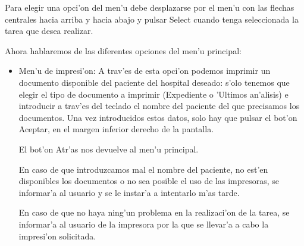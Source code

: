 \begin{enumerate}
Para elegir una opci'on del men'u debe desplazarse por el men'u con las flechas centrales hacia arriba y hacia abajo y pulsar Select cuando tenga seleccionada la tarea que desea realizar.

Ahora hablaremos de las diferentes opciones del men'u principal:
\begin{itemize}

\item Men'u de impresi'on:\newline
A trav'es de esta opci'on podemos imprimir un documento disponible del paciente del hospital deseado: s'olo tenemos que elegir el tipo de documento a imprimir (Expediente o 'Ultimos an'alisis) e introducir a trav'es del teclado el nombre del paciente del que precisamos los documentos. Una vez introducidos estos datos, solo hay que pulsar el bot'on Aceptar, en el margen inferior derecho de la pantalla.


El bot'on Atr'as nos devuelve al men'u principal.

En caso de que introduzcamos mal el nombre del paciente, no est'en disponibles los documentos o no sea posible el uso de las impresoras, se informar'a al usuario y se le instar'a a intentarlo m'as tarde.


En caso de que no haya ning'un problema en la realizaci'on  de la tarea, se informar'a al usuario de la impresora por la que se llevar'a a cabo la impresi'on solicitada.



\end{itemize}
\end{enumerate}
